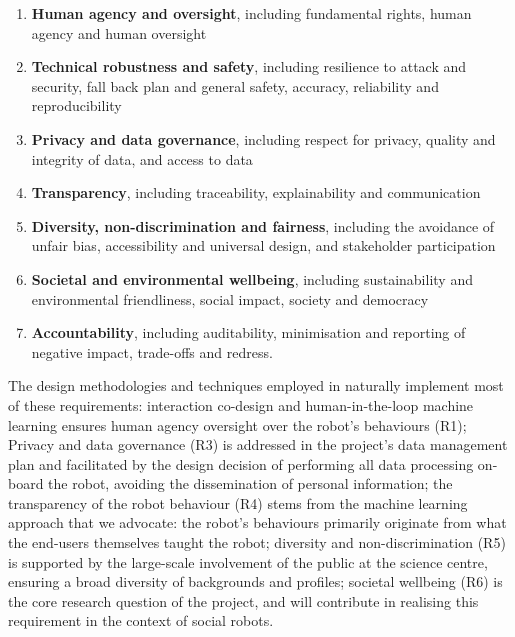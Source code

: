 \begin{enumerate}[label=\textbf{R\arabic*}]
    \item \textbf{Human agency and oversight}, including
            fundamental rights, human agency and human oversight

    \item \textbf{Technical robustness and safety}, including resilience to
        attack and security, fall back plan and general safety, accuracy,
        reliability and reproducibility

    \item \textbf{Privacy and data governance}, including respect for privacy,
        quality and integrity of data, and access to data

    \item \textbf{Transparency}, including traceability, explainability and
        communication

    \item \textbf{Diversity, non-discrimination and fairness}, including the
        avoidance of unfair bias, accessibility and universal design, and
        stakeholder participation

    \item \textbf{Societal and environmental wellbeing}, including
        sustainability and environmental friendliness, social impact, society
        and democracy

    \item \textbf{Accountability}, including auditability, minimisation and
        reporting of negative impact, trade-offs and redress.

\end{enumerate}

The design methodologies and techniques employed in \project naturally implement
most of these requirements: interaction co-design and human-in-the-loop machine
learning ensures human agency oversight over the robot's behaviours (R1);
Privacy and data governance (R3) is addressed in the project's data management
plan and facilitated by the design decision of performing all data processing
on-board the robot, avoiding the dissemination of personal information; the
transparency of the robot behaviour (R4) stems from the machine learning
approach that we advocate: the robot's behaviours primarily originate from what
the end-users themselves taught the robot; diversity and non-discrimination (R5)
is supported by the large-scale involvement of the public at the science centre,
ensuring a broad diversity of backgrounds and profiles; societal wellbeing (R6)
is the core research question of the project, and \project will contribute in
realising this requirement in the context of social robots.

